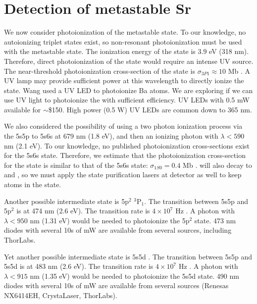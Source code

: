 \section{Detection of metastable Sr}


We now consider photoionization of the metastable \tPz state. To our knowledge, no autoionizing triplet states exist, so non-resonant photoionization must be used with the metastable state. The ionization energy of the \tPz state is 3.9 eV (318 nm). Therefore, direct photoionization of the \tPz state would require an intense UV source. The near-threshold photoionization cross-section of the \tPo state is $\sigma_{3P1}\approx 10$ Mb \cite{Haq07}. A UV lamp may provide sufficient power at this wavelength to directly ionize the \tPz state. Wang \cite{Wan11} used a UV LED to photoionize \tPz Ba atoms. We are exploring if we can use UV light to photoionize the \tPz with sufficient efficiency. UV LEDs with 0.5 mW available for $\sim$\$150. High power (0.5 W) UV LEDs are common down to 365 nm.

We also considered the possibility of using a two photon ionization process via the 5s5p \tPz to 5s6s \tSo at 679 nm (1.8 eV), and then an ionizing photon with $\lambda<590$ nm (2.1 eV). To our knowledge, no published photoionization cross-sections exist for the 5s6s \tSo state. Therefore, we estimate that the photoionization cross-section for the \tSo state is similar to that of the 5s6s \sSz state: $\sigma_{1S0}=0.4$ Mb \cite{Sam06}. \tSo will also decay to \tPo and \tPt, so we must apply the state purification lasers at detector as well to keep atoms in the \tSo state.

Another possible intermediate state is 5p$^2$ $^3\textrm{P}_1$. The transition between 5s5p \tPz and 5p$^2$ \tPo is at 474 nm (2.6 eV). The transition rate is $4\times10^7$ Hz \cite{Por08}. A photon with $\lambda< 950$ nm (1.31 eV) would be needed to photoionize the 5p$^2$ \tPo state. 473 nm diodes with several 10s of mW are available from several sources, including ThorLabs.

Yet another possible intermediate state is 5s5d \tDo. The transition between 5s5p \tPz and 5s5d \tDo is at 483 nm (2.6 eV). The transition rate is $4\times10^7$ Hz \cite{Por08}. A photon with $\lambda< 915$ nm (1.35 eV) would be needed to photoionize the 5s5d \tDo state. 490 nm diodes with several 10s of mW are available from several sources (Renesas NX6414EH, CrystaLaser, ThorLabs).




